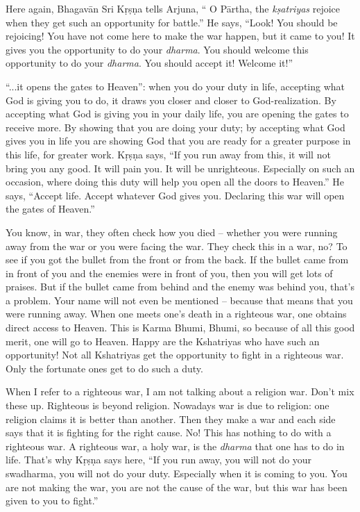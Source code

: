 Here again, Bhagavān Sri Kṛṣṇa tells Arjuna, “ O Pārtha, the \textit{kṣatriyas} rejoice when they get such an opportunity for battle.” He says, “Look! You should be rejoicing! You have not come here to make the war happen, but it came to you! It gives you the opportunity to do your \textit{dharma}. You should welcome this opportunity to do your \textit{dharma}. You should accept it! Welcome it!”

“...it opens the gates to Heaven”: when you do your duty in life, accepting what God is giving you to do, it draws you closer and closer to God-realization. By accepting what God is giving you in your daily life, you are opening the gates to receive more. By showing that you are doing your duty; by accepting what God gives you in life you are showing God that you are ready for a greater purpose in this life, for greater work. Kṛṣṇa says, “If you run away from this, it will not bring you any good. It will pain you. It will be unrighteous. Especially on such an occasion, where doing this duty will help you open all the doors to Heaven.” He says, “Accept life. Accept whatever God gives you. Declaring this war will open the gates of Heaven.”

You know, in war, they often check how you died – whether you were running away from the war or you were facing the war. They check this in a war, no? To see if you got the bullet from the front or from the back. If the bullet came from in front of you and the enemies were in front of you, then you will get lots of praises. But if the bullet came from behind and the enemy was behind you, that’s a problem. Your name will not even be mentioned – because that means that you were running away. When one meets one’s death in a righteous war, one obtains direct access to Heaven. This is Karma Bhumi,  Bhumi, so because of all this good merit, one will go to Heaven. Happy are the Kshatriyas who have such an opportunity! Not all Kshatriyas get the opportunity to fight in a righteous war. Only the fortunate ones get to do such a duty.

When I refer to a righteous war, I am not talking about a religion war. Don’t mix these up. Righteous is beyond religion. Nowadays war is due to religion: one religion claims it is better than another. Then they make a war and each side says that it is fighting for the right cause. No! This has nothing to do with a righteous war. A righteous war, a holy war, is the \textit{dharma} that one has to do in life. That’s why Kṛṣṇa says here, “If you run away, you will not do your swadharma, you will not do your duty. Especially when it is coming to you. You are not making the war, you are not the cause of the war, but this war has been given to you to fight.”


